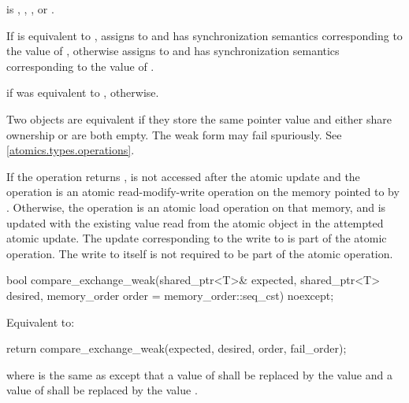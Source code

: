 \begin{itemdescr}
\pnum
\expects
{} is
,
,
, or
.

\pnum
\effects
If  is equivalent to ,
assigns  to  and
has synchronization semantics corresponding to the value of ,
otherwise assigns  to  and
has synchronization semantics corresponding to the value of .

\pnum
\returns
{} if  was equivalent to ,
 otherwise.

\pnum
\remarks
Two  objects are equivalent if
they store the same pointer value and
either share ownership or are both empty.
The weak form may fail spuriously. See \ref{atomics.types.operations}.

\pnum
If the operation returns ,
 is not accessed after the atomic update and
the operation is an atomic read-modify-write operation
on the memory pointed to by .
Otherwise, the operation is an atomic load operation on that memory, and
 is updated with the existing value
read from the atomic object in the attempted atomic update.
The  update corresponding to the write to 
is part of the atomic operation.
The write to  itself
is not required to be part of the atomic operation.
\end{itemdescr}

%
\begin{itemdecl}
bool compare_exchange_weak(shared_ptr<T>& expected, shared_ptr<T> desired,
                           memory_order order = memory_order::seq_cst) noexcept;
\end{itemdecl}

\begin{itemdescr}
\pnum
\effects
Equivalent to:
\begin{codeblock}
return compare_exchange_weak(expected, desired, order, fail_order);
\end{codeblock}
where  is the same as 
except that a value of 
shall be replaced by the value  and
a value of 
shall be replaced by the value .
\end{itemdescr}

